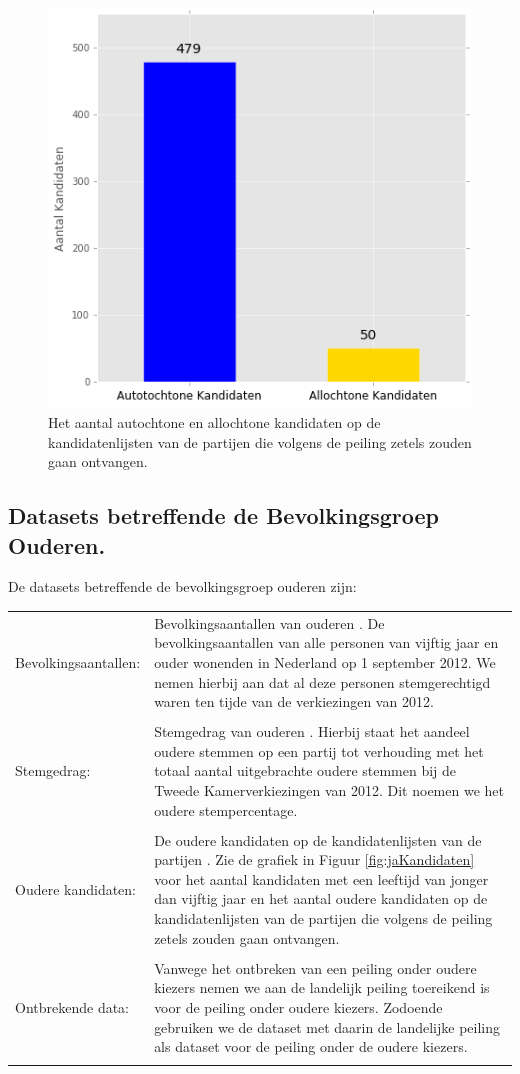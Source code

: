 \begin{figure}[H]
\centering
	\includegraphics[width=0.42\linewidth]{aa_kandidaten.png}

			\caption{Het aantal autochtone en allochtone kandidaten op de kandidatenlijsten \citep{Kiesraad_databank} van de partijen die volgens de peiling \citep{IPSOS} zetels zouden gaan ontvangen.}

\label{fig:aaKandidaten}
\end{figure}


\subsection{Datasets betreffende de Bevolkingsgroep Ouderen.}
De datasets betreffende de bevolkingsgroep ouderen zijn:\\

\noindent\begin{tabularx}{\textwidth}{LI}
Bevolkingsaantallen: &Bevolkingsaantallen van ouderen \citep{CBS_allochtonen}. De bevolkingsaantallen van alle personen van vijftig jaar en ouder wonenden in Nederland op 1 september 2012. We nemen hierbij aan dat al deze personen stemgerechtigd waren ten tijde van de verkiezingen van 2012.   \\
\\  
Stemgedrag:  & Stemgedrag van ouderen \citep{CBS_stemgedrag}. Hierbij staat het aandeel oudere stemmen op een partij tot verhouding met het totaal aantal uitgebrachte oudere stemmen bij de Tweede Kamerverkiezingen van 2012. Dit noemen we het oudere stempercentage. \\
\\
Oudere kandidaten: & De oudere kandidaten op de kandidatenlijsten van de partijen \citep{allekandidaten}. Zie de grafiek in Figuur \ref{fig:jaKandidaten} voor het aantal kandidaten met een leeftijd van jonger dan vijftig jaar en het aantal oudere kandidaten op de kandidatenlijsten van de partijen die volgens de peiling zetels zouden gaan ontvangen. \\
  \\
Ontbrekende data: &  Vanwege het ontbreken van een peiling onder oudere kiezers nemen we aan de landelijk peiling toereikend is voor de peiling onder oudere kiezers. Zodoende gebruiken we de dataset met daarin de landelijke peiling als dataset voor de peiling onder de oudere kiezers.\\
\\
 \end{tabularx}


